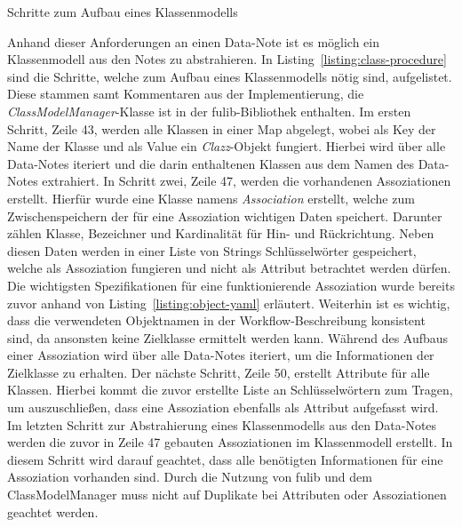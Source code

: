 
\begin{listing}[!ht]
    \inputminted[firstnumber=39]{java}{listings/3.1.4/ClassProcedure.java}
    \caption{Schritte zum Aufbau eines Klassenmodells}
    \label{listing:class-procedure}
\end{listing}

Anhand dieser Anforderungen an einen Data-Note ist es möglich ein Klassenmodell aus den Notes zu abstrahieren.
In Listing~\ref{listing:class-procedure} sind die Schritte, welche zum Aufbau eines Klassenmodells nötig sind, aufgelistet.
Diese stammen samt Kommentaren aus der Implementierung, die \textit{ClassModelManager}-Klasse ist in der fulib-Bibliothek enthalten.
Im ersten Schritt, Zeile 43, werden alle Klassen in einer Map abgelegt, wobei als Key der Name der Klasse und als Value ein \textit{Clazz}-Objekt fungiert.
Hierbei wird über alle Data-Notes iteriert und die darin enthaltenen Klassen aus dem Namen des Data-Notes extrahiert.
In Schritt zwei, Zeile 47, werden die vorhandenen Assoziationen erstellt.
Hierfür wurde eine Klasse namens \textit{Association} erstellt, welche zum Zwischenspeichern der für eine Assoziation wichtigen Daten speichert.
Darunter zählen Klasse, Bezeichner und Kardinalität für Hin- und Rückrichtung.
Neben diesen Daten werden in einer Liste von Strings Schlüsselwörter gespeichert, welche als Assoziation fungieren und nicht als Attribut betrachtet werden dürfen.
Die wichtigsten Spezifikationen für eine funktionierende Assoziation wurde bereits zuvor anhand von Listing~\ref{listing:object-yaml} erläutert.
Weiterhin ist es wichtig, dass die verwendeten Objektnamen in der Workflow-Beschreibung konsistent sind, da ansonsten keine Zielklasse ermittelt werden kann.
Während des Aufbaus einer Assoziation wird über alle Data-Notes iteriert, um die Informationen der Zielklasse zu erhalten.
Der nächste Schritt, Zeile 50, erstellt Attribute für alle Klassen.
Hierbei kommt die zuvor erstellte Liste an Schlüsselwörtern zum Tragen, um auszuschließen, dass eine Assoziation ebenfalls als Attribut aufgefasst wird.
Im letzten Schritt zur Abstrahierung eines Klassenmodells aus den Data-Notes werden die zuvor in Zeile 47 gebauten Assoziationen im Klassenmodell erstellt.
In diesem Schritt wird darauf geachtet, dass alle benötigten Informationen für eine Assoziation vorhanden sind.
Durch die Nutzung von fulib und dem ClassModelManager muss nicht auf Duplikate bei Attributen oder Assoziationen geachtet werden.

